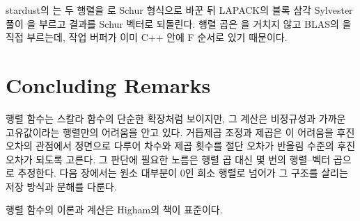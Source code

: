 \begin{instardust}
stardust의 는 두 행렬을 로 Schur 형식으로 바꾼 뒤 LAPACK의 블록 삼각 Sylvester 풀이 을 부르고 결과를 Schur 벡터로 되돌린다. 행렬 곱은 을 거치지 않고 BLAS의 을 직접 부르는데, 작업 버퍼가 이미 C++ 안에 F 순서로 있기 때문이다.
\end{instardust}

\section{Concluding Remarks}

행렬 함수는 스칼라 함수의 단순한 확장처럼 보이지만, 그 계산은 비정규성과 가까운 고유값이라는 행렬만의 어려움을 안고 있다. 거듭제곱 조정과 제곱은 이 어려움을 후진 오차의 관점에서 정면으로 다루어 차수와 제곱 횟수를 절단 오차가 반올림 수준의 후진 오차가 되도록 고른다. 그 판단에 필요한 노름은 행렬 곱 대신 몇 번의 행렬--벡터 곱으로 추정한다. 다음 장에서는 원소 대부분이 $0$인 희소 행렬로 넘어가 그 구조를 살리는 저장 방식과 분해를 다룬다.

행렬 함수의 이론과 계산은 Higham의 책\cite{higham2008functions}이 표준이다.

\chapterreferences

